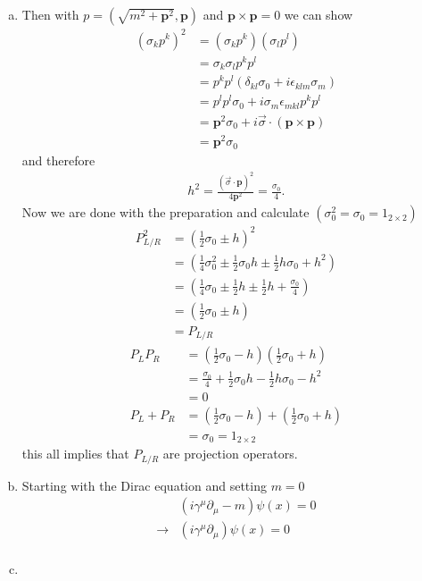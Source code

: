 \documentclass[../main.tex]{subfiles}
\begin{document}
\begin{enumerate}[(a)]
\item Then with $p=(\sqrt{m^2+\mathbf{p}^2},\mathbf{p})$ and $\mathbf{p\times p}=0$ we can show
\begin{align}
(\sigma_k p^k)^2
&=(\sigma_k p^k)(\sigma_l p^l)\\
&=\sigma_k \sigma_l p^k p^l\\
&=p^k p^l(\delta_{kl}\sigma_0+i\epsilon_{klm}\sigma_m)\\
&=p^lp^l\sigma_0+i\sigma_m\epsilon_{mkl}p^k p^l\\
&=\mathbf{p}^2\sigma_0+i\vec{\sigma}\cdot(\mathbf{p\times p})\\
&=\mathbf{p}^2\sigma_0
\end{align}
and therefore
\begin{align}
h^2=\frac{(\vec{\sigma}\cdot\mathbf{p})^2}{4\mathbf{p}^2}=\frac{\sigma_0}{4}.
\end{align}
Now we are done with the preparation and calculate $(\sigma_0^2=\sigma_0=1_{2\times2})$
\begin{align}
P_{L/R}^2
&=\left(\frac{1}{2}\sigma_0\pm h\right)^2\\
&=\left(\frac{1}{4}\sigma_0^2\pm \frac{1}{2}\sigma_0h\pm \frac{1}{2}h\sigma_0+h^2\right)\\
&=\left(\frac{1}{4}\sigma_0\pm \frac{1}{2}h\pm \frac{1}{2}h+\frac{\sigma_0}{4}\right)\\
&=\left(\frac{1}{2}\sigma_0\pm h\right)\\
&=P_{L/R}
\end{align}
\begin{align}
P_LP_R
&=\left(\frac{1}{2}\sigma_0- h\right)\left(\frac{1}{2}\sigma_0+ h\right)\\
&=\frac{\sigma_0}{4}+\frac{1}{2}\sigma_0h-\frac{1}{2}h\sigma_0-h^2\\
&=0\\
P_L+P_R
&=\left(\frac{1}{2}\sigma_0- h\right)+\left(\frac{1}{2}\sigma_0+ h\right)\\
&=\sigma_0=1_{2\times2}
\end{align}
this all implies that $P_{L/R}$ are projection operators.

\item Starting with the Dirac equation and setting $m=0$
\begin{align}
&(i\gamma^\mu\partial_\mu-m)\psi(x)=0\\
\rightarrow&(i\gamma^\mu\partial_\mu)\psi(x)=0\\
\end{align}

\item
\end{enumerate}
\end{document}
